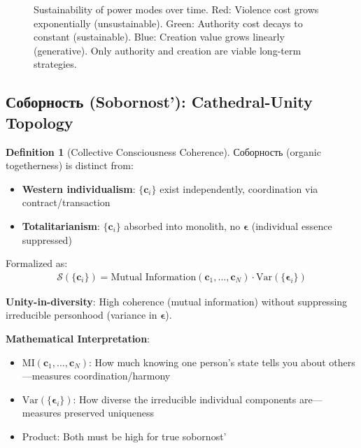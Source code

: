 \documentclass[11pt,a4paper]{article}
\theoremstyle{definition}
\newtheorem{definition}{Definition}[section]
\theoremstyle{remark}
\newcommand{\cc}{\mathbf{c}}
\begin{document}
\begin{small}
\begin{enumerate}
\begin{figure}[H]
\caption{Sustainability of power modes over time. Red: Violence cost grows exponentially (unsustainable). Green: Authority cost decays to constant (sustainable). Blue: Creation value grows linearly (generative). Only authority and creation are viable long-term strategies.}
\label{fig:power_sustainability}
\end{figure}

\subsection{Соборность (Sobornost'): Cathedral-Unity Topology}

\begin{definition}[Collective Consciousness Coherence]
Соборность (organic togetherness) is distinct from:
\begin{itemize}
\item \textbf{Western individualism}: \(\{\cc_i\}\) exist independently, coordination via contract/transaction
\item \textbf{Totalitarianism}: \(\{\cc_i\}\) absorbed into monolith, no \(\boldsymbol{\epsilon}\) (individual essence suppressed)
\end{itemize}

Formalized as:
\begin{align}
\mathcal{S}(\{\cc_i\}) = \text{Mutual Information}(\cc_1, \ldots, \cc_N) \cdot \text{Var}(\{\boldsymbol{\epsilon}_i\})
\end{align}

\textbf{Unity-in-diversity}: High coherence (mutual information) without suppressing irreducible personhood (variance in \(\boldsymbol{\epsilon}\)).

\textbf{Mathematical Interpretation}:
\begin{itemize}
    \item \(\text{MI}(\cc_1, \ldots, \cc_N)\): How much knowing one person's state tells you about others—measures coordination/harmony
    \item \(\text{Var}(\{\boldsymbol{\epsilon}_i\})\): How diverse the irreducible individual components are—measures preserved uniqueness
    \item Product: Both must be high for true sobornost'
\end{itemize}
\end{definition}


\end{enumerate}
\end{small}
\end{document}
